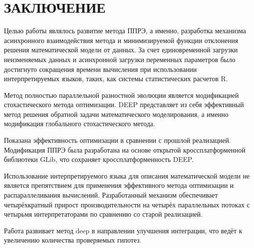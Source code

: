 \chapter*{ЗАКЛЮЧЕНИЕ}

Целью работы являлось развитие метода ППРЭ,
а именно, разработка механизма асинхронного взаимодействия
метода и минимизируемой функции отклонения
решения математической модели от данных.
За счет единовременной загрузки неизменяемых данных
и асинхронной загрузки переменных параметров
было достигнуто сокращения времени вычисления
при использовании интерпретируемых языков,
таких, как системы статистических расчетов R.

Метод полностью параллельной разностной эволюции
является модификацией стохастического метода оптимизации.
DEEP представляет из себя
эффективный метод решения обратной задачи
математического моделирования,
а именно модификация глобального стохастического метода.

Показана эффективность
оптимизации в сравнении с
прошлой реализацией.
Модификация ППРЭ
была разработана на основе
открытой кроссплатформенной
библиотеки GLib,
что сохраняет кроссплатформенность DEEP.

Использование интерпретируемого языка
для описания математической модели
не является препятствием для применения
эффективного метода оптимизации
и распараллеливания вычислений.
Разработанный механизм обеспечивает
четырёхкратный прирост производительности
на четырёх параллельных потоках
с четырьмя интерпретаторами
по сравнению со старой реализацией.

Работа развивает метод deep
в направлении улучшения интеграции,
что ведёт к увеличению количества
проверяемых гипотез.

